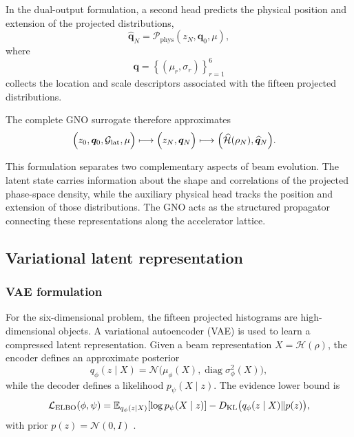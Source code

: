 In the dual-output formulation, a second head predicts the physical position and extension of the projected distributions,
\begin{equation}
\widehat{\bm q}_{N}
=
\mathcal{P}_{\mathrm{phys}}
\left(
z_N,
\bm q_0,
\mu
\right),
\label{eq:gno_physics_head}
\end{equation}
where
\begin{equation}
\bm q
=
\left\{
(\mu_r,\sigma_r)
\right\}_{r=1}^{6}
\end{equation}
collects the location and scale descriptors associated with the fifteen projected distributions.

The complete GNO surrogate therefore approximates
\begin{equation}
\begin{split}
&
\Bigl(
z_0,
\bm q_0,
\mathcal{G}_{\mathrm{lat}},
\mu
\Bigr)
\longmapsto
\Bigl(
z_N,
\bm q_N
\Bigr)
\longmapsto
\Bigl(
\widehat{\mathcal{H}}(\rho_N),
\widehat{\bm q}_N
\Bigr).
\end{split}
\label{eq:gno_complete_surrogate}
\end{equation}

This formulation separates two complementary aspects of beam evolution. The latent state carries information about the shape and correlations of the projected phase-space density, while the auxiliary physical head tracks the position and extension of those distributions. The GNO acts as the structured propagator connecting these representations along the accelerator lattice.

\subsection{Variational latent representation}
\subsubsection{VAE formulation}
For the six-dimensional problem, the fifteen projected histograms are high-dimensional objects. A variational autoencoder (VAE) is used to learn a compressed latent representation. Given a beam representation $X=\mathcal{H}(\rho)$, the encoder defines an approximate posterior
\begin{equation}
    q_{\phi}(z\mid X)=\mathcal{N}\big(\mu_{\phi}(X),\operatorname{diag}\sigma_{\phi}^{2}(X)\big),
\end{equation}
while the decoder defines a likelihood $p_{\psi}(X\mid z)$. The evidence lower bound is
\begin{equation}
    \mathcal{L}_{\mathrm{ELBO}}(\phi,\psi)=\mathbb{E}_{q_{\phi}(z\mid X)}[\log p_{\psi}(X\mid z)]-D_{\mathrm{KL}}\big(q_{\phi}(z\mid X)\|p(z)\big),
    \label{eq:vae_elbo_revised}
\end{equation}
with prior $p(z)=\mathcal{N}(0,I)$ \cite{kingma_autoencoding_2014}.

